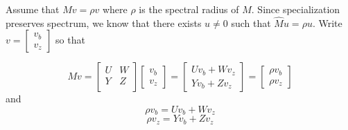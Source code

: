 \documentclass{paper}
\begin{document}
Assume that $Mv = \rho v$ where $\rho$ is the spectral radius of $M$. Since specialization preserves spectrum, we know that there exists $u \neq 0$ such that $\hat{M}u = \rho u$. Write $v = \begin{bmatrix}
v_b \\ v_z
\end{bmatrix}$ so that 

\[Mv = \begin{bmatrix} U & W \\ Y & Z \\ \end{bmatrix} \begin{bmatrix} v_b \\ v_z \end{bmatrix}
=
\begin{bmatrix}Uv_b + Wv_z \\ Yv_b + Zv_z \end{bmatrix}
= 
\begin{bmatrix}\rho v_b \\ \rho v_z \end{bmatrix}
\]
and \begin{equation}
\rho v_b = Uv_b + Wv_z
\end{equation}
\begin{equation}
\rho v_z = Yv_b + Zv_z 
\end{equation}
\end{document}
